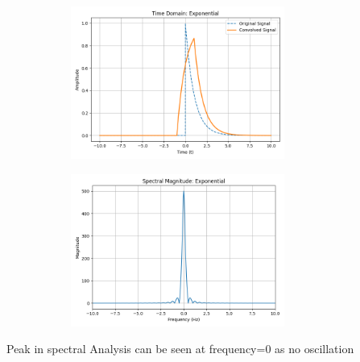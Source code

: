 \documentclass[a4paper,12pt]{article}
\begin{document}
\begin{figure}[H]
    \centering
    \begin{subfigure}{0.5\textwidth}
        \centering
        \includegraphics[height=5cm]{figs/Analysis4.png}
    \end{subfigure}%
    \begin{subfigure}{0.5\textwidth}
        \centering
        \includegraphics[height=5cm]{figs/Analysis5.png}
    \end{subfigure}
\end{figure}
Peak in spectral Analysis can be seen at frequency=0 as no oscillation
\end{document}

